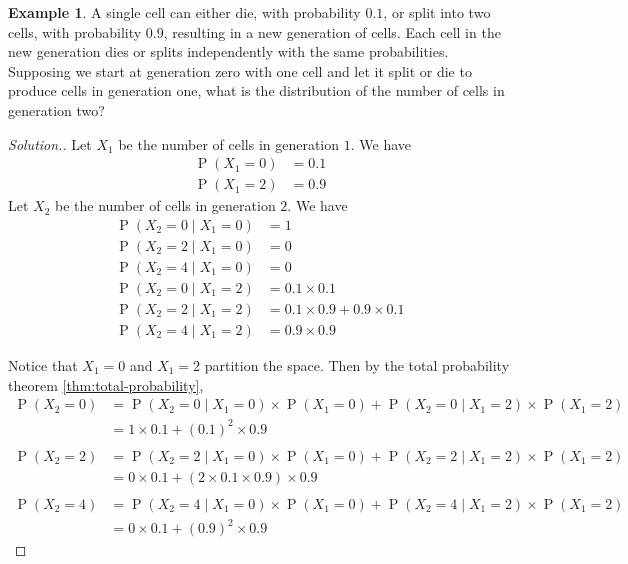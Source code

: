 \documentclass[11pt,letterpaper]{article}
\makeatletter
\theoremstyle{definition}
\newtheorem{eg}{Example}
\theoremstyle{remark}
\newenvironment{solution}{
    \let\oldqedsymbol=\qedsymbol%
    \def\@addpunct##1{}%
    \renewcommand{\qedsymbol}{$\blacktriangleleft$}%
    \begin{proof}[\textit Solution.]
}{
    \end{proof}%
    \renewcommand{\qedsymbol}{\oldqedsymbol}
}
\newcommand{\parens}[1]{\left(#1\right)}
\newcommand{\given}{\;\vert\;}
\DeclareMathOperator{\Prob}{P}
\renewcommand{\P}[1]{\Prob{\parens{#1}}}
\makeatother
\begin{document}
\begin{eg}
    A single cell can either die, with probability $0.1$, or split into two
    cells, with probability $0.9$, resulting in a new generation of cells. Each
    cell in the new generation dies or splits independently with the same
    probabilities. Supposing we start at generation zero with one cell and let
    it split or die to produce cells in generation one, what is the
    distribution of the number of cells in generation two?
\end{eg}

\begin{solution}
    Let $X_1$ be the number of cells in generation $1$. We have
    \begin{align*}
        \P{X_1 = 0} &= 0.1 \\
        \P{X_1 = 2} &= 0.9
    \end{align*}
    Let $X_2$ be the number of cells in generation $2$. We have
    \begin{align*}
        \P{X_2 = 0 \given X_1 = 0} &= 1 \\
        \P{X_2 = 2 \given X_1 = 0} &= 0 \\
        \P{X_2 = 4 \given X_1 = 0} &= 0 \\
        \P{X_2 = 0 \given X_1 = 2} &= 0.1 \times 0.1 \\
        \P{X_2 = 2 \given X_1 = 2} &= 0.1 \times 0.9 + 0.9 \times 0.1 \\
        \P{X_2 = 4 \given X_1 = 2} &= 0.9 \times 0.9
    \end{align*}

    Notice that $X_1 = 0$ and $X_1 = 2$ partition the space.
    Then by the total probability theorem \eqref{thm:total-probability},
    \begin{align*}
        \P{X_2 = 0}
        &= \P{X_2 = 0 \given X_1 = 0} \times \P{X_1 = 0}
        + \P{X_2 = 0 \given X_1 = 2} \times \P{X_1 = 2} \\
        &= 1 \times 0.1 + (0.1)^2 \times 0.9 \\
        \\
        \P{X_2 = 2}
        &= \P{X_2 = 2 \given X_1 = 0} \times \P{X_1 = 0}
        + \P{X_2 = 2 \given X_1 = 2} \times \P{X_1 = 2} \\
        &= 0 \times 0.1 + (2 \times 0.1 \times 0.9) \times 0.9 \\
        \\
        \P{X_2 = 4}
        &= \P{X_2 = 4 \given X_1 = 0} \times \P{X_1 = 0}
        + \P{X_2 = 4 \given X_1 = 2} \times \P{X_1 = 2} \\
        &= 0 \times 0.1 + (0.9)^2\times 0.9
    \end{align*}
\end{solution}
\end{document}
